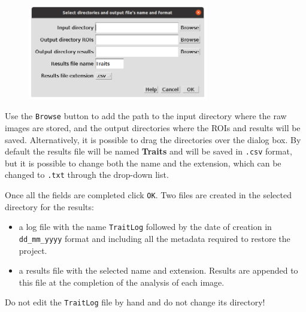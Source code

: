 \documentclass[
  letterpaper,
]{scrbook}
\providecommand{\tightlist}{%
  \setlength{\itemsep}{0pt}\setlength{\parskip}{0pt}}\usepackage{longtable,booktabs,array}
\begin{document}
\begin{figure}

{\centering \includegraphics[width=0.7\textwidth,height=\textheight]{./images/screenshots/dialog_select_directories.png}

}

\end{figure}

Use the \texttt{Browse} button to add the path to the input directory
where the raw images are stored, and the output directories where the
ROIs and results will be saved. Alternatively, it is possible to drag
the directories over the dialog box. By default the results file will be
named \textbf{Traits} and will be saved in \texttt{.csv} format, but it
is possible to change both the name and the extension, which can be
changed to \texttt{.txt} through the drop-down list.

Once all the fields are completed click \texttt{OK}. Two files are
created in the selected directory for the results:

\begin{itemize}
\tightlist
\item
  a log file with the name \texttt{TraitLog} followed by the date of
  creation in \texttt{dd\_mm\_yyyy} format and including all the
  metadata required to restore the project.
\item
  a results file with the selected name and extension. Results are
  appended to this file at the completion of the analysis of each image.
\end{itemize}

\begin{tcolorbox}[standard jigsaw,bottomtitle=1mm, toptitle=1mm, colframe=quarto-callout-important-color-frame, colbacktitle=quarto-callout-important-color!10!white, title=\textcolor{quarto-callout-important-color}{\faExclamation}\hspace{0.5em}{Important}, titlerule=0mm, opacityback=0, arc=.35mm, opacitybacktitle=0.6, rightrule=.15mm, toprule=.15mm, coltitle=black, left=2mm, colback=white, leftrule=.75mm, bottomrule=.15mm]
Do not edit the \texttt{TraitLog} file by hand and do not change its
directory!
\end{tcolorbox}
\end{document}
